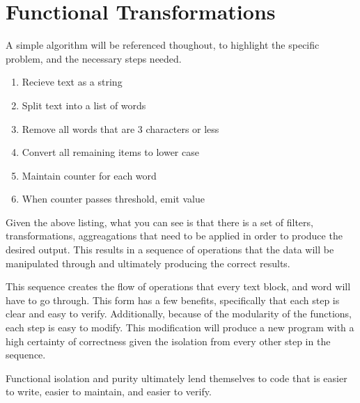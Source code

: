 \chapter{Functional Transformations}

A simple algorithm will be referenced thoughout, to highlight the specific problem, and the necessary steps needed.

\begin{enumerate}
  \item Recieve text as a string
  \item Split text into a list of words
  \item Remove all words that are 3 characters or less
  \item Convert all remaining items to lower case
  \item Maintain counter for each word 
  \item When counter passes threshold, emit value
\end{enumerate}

Given the above listing, what you can see is that there is a set of filters, transformations, aggreagations that need to be applied in order to produce the desired output.  This results in a sequence of operations that the data will be manipulated through and ultimately producing the correct results.  

This sequence creates the flow of operations that every text block, and word will have to go through.  This form has a few benefits, specifically that each step is clear and easy to verify.  Additionally, because of the modularity of the functions, each step is easy to modify.  This modification will produce a new program with a high certainty of correctness given the isolation from every other step in the sequence.  

Functional isolation and purity ultimately lend themselves to code that is easier to write, easier to maintain, and easier to verify.  


